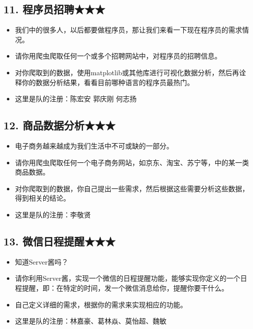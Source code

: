\documentclass[11pt]{article}
\providecommand{\tightlist}{%
      \setlength{\itemsep}{0pt}\setlength{\parskip}{0pt}}
\begin{document}
    \subsection{11. 程序员招聘★★★}\label{ux7a0bux5e8fux5458ux62dbux8058}

\begin{itemize}
\tightlist
\item
  我们中的很多人，以后都要做程序员，那让我们来看一下现在程序员的需求情况。
\item
  请你用爬虫爬取任何一个或多个招聘网站中，对程序员的招聘信息。
\item
  对你爬取到的数据，使用matplotlib或其他库进行可视化数据分析，然后再诠释你的数据分析结果，看看目前哪种语言的程序员最热门。
\item
  这里是队的注册：陈宏安 郭庆刚 何志扬
\end{itemize}

    \subsection{12.
商品数据分析★★★}\label{ux5546ux54c1ux6570ux636eux5206ux6790}

\begin{itemize}
\tightlist
\item
  电子商务越来越成为我们生活中不可或缺的一部分。
\item
  请你用爬虫爬取任何一个电子商务网站，如京东、淘宝、苏宁等，中的某一类商品数据。
\item
  对你爬取到的数据，你自己提出一些需求，然后根据这些需要分析这些数据，得到相关的结论。
\item
  这里是队的注册：李敬贤
\end{itemize}

    \subsection{13.
微信日程提醒★★★}\label{ux5faeux4fe1ux65e5ux7a0bux63d0ux9192}

\begin{itemize}
\tightlist
\item
  知道Server酱吗？
\item
  请你利用Server酱，实现一个微信的日程提醒功能，能够实现你定义的一个日程提醒，即：在特定的时间，发一个微信消息给你，提醒你要干什么。
\item
  自己定义详细的需求，根据你的需求来实现相应的功能。
\item
  这里是队的注册：林嘉豪、葛林焱、莫怡超、魏敏
\end{itemize}
\end{document}
